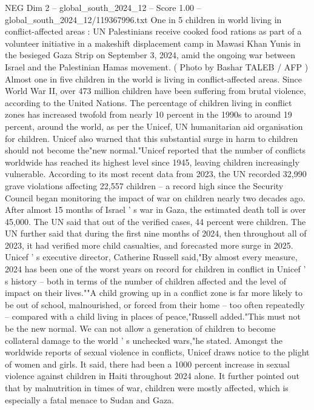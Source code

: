 \begin{textsample}{NEG Dim 2 – global\_south\_2024\_12 – Score 1.00 – global\_south\_2024\_12/119367996.txt}  \label{ex:f2_neg_235}
One in 5 children in world living in conflict-affected areas : UN Palestinians receive cooked food rations as part of a volunteer initiative in a makeshift displacement camp in Mawasi Khan Yunis in the besieged Gaza Strip on September 3, 2024, amid the ongoing war between Israel and the Palestinian Hamas movement. ( Photo by Bashar TALEB / AFP ) Almost one in five children in the world is living in conflict-affected areas.
Since World War II, over 473 million children have been suffering from brutal violence, according to the United Nations.
The percentage of children living in conflict zones has increased twofold from nearly 10 percent in the 1990s to around 19 percent, around the world, as per the Unicef, UN humanitarian aid organisation for children.
Unicef also warned that this substantial surge in harm to children should not become the"new normal."Unicef reported that the number of conflicts worldwide has reached its highest level since 1945, leaving children increasingly vulnerable.
According to its most recent data from 2023, the UN recorded 32,990 grave violations affecting 22,557 children -- a record high since the Security Council began monitoring the impact of war on children nearly two decades ago.
After almost 15 months of Israel ' s war in Gaza, the estimated death toll is over 45,000.
The UN said that out of the verified cases, 44 percent were children.
The UN further said that during the first nine months of 2024, then throughout all of 2023, it had verified more child casualties, and forecasted more surge in 2025.
Unicef ' s executive director, Catherine Russell said,"By almost every measure, 2024 has been one of the worst years on record for children in conflict in Unicef ' s history -- both in terms of the number of children affected and the level of impact on their lives.""A child growing up in a conflict zone is far more likely to be out of school, malnourished, or forced from their home -- too often repeatedly -- compared with a child living in places of peace,"Russell added."This must not be the new normal.
We can not allow a generation of children to become collateral damage to the world ' s unchecked wars,"he stated.
Amongst the worldwide reports of sexual violence in conflicts, Unicef draws notice to the plight of women and girls.
It said, there had been a 1000 percent increase in sexual violence against children in Haiti throughout 2024 alone.
It further pointed out that by malnutrition in times of war, children were mostly affected, which is especially a fatal menace to Sudan and Gaza.

\end{textsample}
